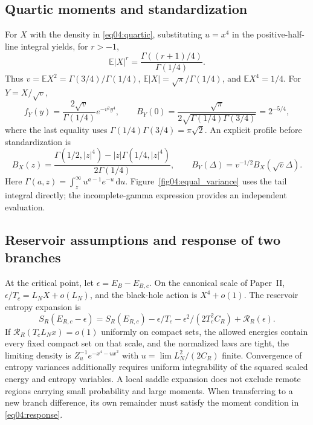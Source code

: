 \documentclass[11pt,letterpaper]{article}
\theoremstyle{plain}
\theoremstyle{definition}
\theoremstyle{remark}
\newcommand{\E}{\mathbb{E}}
\begin{document}
\subsection{Quartic moments and standardization}

For $X$ with the density in \eqref{eq04:quartic}, substituting $u=x^4$
in the positive-half-line integral yields, for $r>-1$,
\begin{equation}
 \E|X|^r=\frac{\Gamma((r+1)/4)}{\Gamma(1/4)}.
 \label{eq13:quartic_moments}
\end{equation}
Thus $v=\E X^2=\Gamma(3/4)/\Gamma(1/4)$,
$\E|X|=\sqrt\pi/\Gamma(1/4)$, and $\E X^4=1/4$.
For $Y=X/\sqrt v$,
\begin{equation}
 f_Y(y)=\frac{2\sqrt v}{\Gamma(1/4)}e^{-v^2y^4},\qquad
 B_Y(0)=\frac{\sqrt\pi}{2\sqrt{\Gamma(1/4)\Gamma(3/4)}}
 =2^{-5/4},
 \label{eq13:standard_quartic}
\end{equation}
where the last equality uses
$\Gamma(1/4)\Gamma(3/4)=\pi\sqrt2$.
An explicit profile before standardization is
\begin{equation}
 B_X(z)=\frac{\Gamma(1/2,|z|^4)
             -|z|\Gamma(1/4,|z|^4)}{2\Gamma(1/4)},\qquad
 B_Y(\Delta)=v^{-1/2}B_X(\sqrt v\Delta).
 \label{eq13:quartic_profile}
\end{equation}
Here $\Gamma(a,z)=\int_z^\infty u^{a-1}e^{-u}\,\mathrm du$.
Figure~\ref{fig04:equal_variance} uses the tail integral directly; the
incomplete-gamma expression provides an independent evaluation.

\subsection{Reservoir assumptions and response of two branches}

At the critical point, let $\epsilon=E_B-E_{B,c}$. On the canonical
scale of Paper~II,
$\epsilon/T_c=L_N X+o(L_N)$, and the black-hole action is $X^4+o(1)$.
The reservoir entropy expansion is
\begin{equation}
 S_R(E_{R,c}-\epsilon)=S_R(E_{R,c})-\epsilon/T_c
 -\epsilon^2/(2T_c^2C_R)+\mathcal R_R(\epsilon).
 \label{eq13:reservoir_expansion}
\end{equation}
If $\mathcal R_R(T_cL_Nx)=o(1)$ uniformly on compact sets, the allowed
energies contain every fixed compact set on that scale, and the
normalized laws are tight, the limiting density is
$Z_u^{-1}e^{-x^4-ux^2}$ with $u=\lim L_N^2/(2C_R)$ finite.
Convergence of entropy variances additionally requires uniform
integrability of the squared scaled energy and entropy variables.
A local saddle expansion does not exclude remote regions carrying
small probability and large moments. When transferring to a new
branch difference, its own remainder must satisfy the moment condition
in \eqref{eq04:response}.
\end{document}
